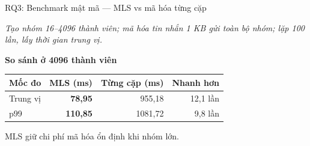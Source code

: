 \documentclass[t, aspectratio=169]{beamer}
\begin{document}
\begin{frame}[c]{RQ3: Benchmark mật mã — MLS vs mã hóa từng cặp}
	\vspace{-0.5em}
	\begin{center}
		{\scriptsize \textit{Tạo nhóm 16--4096 thành viên; mã hóa tin nhắn 1 KB gửi toàn bộ nhóm; lặp 100 lần, lấy thời gian trung vị.}}
	\end{center}
	\vspace{0.8em}
	\begin{center}
		{\large \textbf{So sánh ở 4096 thành viên}}
	\end{center}
	\vspace{0.5em}
	\begin{center}
		\scriptsize
		\renewcommand{\arraystretch}{1.4}
		\setlength{\tabcolsep}{10pt}
		\begin{tabular}{|l|r|r|r|}
			\hline
			\textbf{Mốc đo} & \textbf{MLS (ms)} & \textbf{Từng cặp (ms)} & \textbf{Nhanh hơn} \\
			\hline
			Trung vị & \textbf{78,95} & 955,18 & 12,1 lần \\
			\hline
			p99 & \textbf{110,85} & 1081,72 & 9,8 lần \\
			\hline
		\end{tabular}
	\end{center}
	\vspace{0.8em}
	\begin{center}
		{\scriptsize MLS giữ chi phí mã hóa ổn định khi nhóm lớn.}
	\end{center}
\end{frame}
\end{document}
